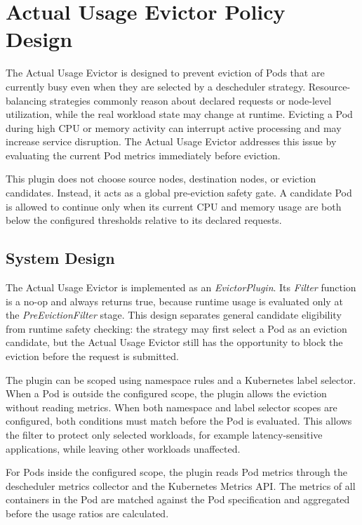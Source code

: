 \section{Actual Usage Evictor Policy Design}
\label{sec:actualusage_policydesign}
The Actual Usage Evictor is designed to prevent eviction of Pods that are currently busy even when they are selected by a descheduler strategy. Resource-balancing strategies commonly reason about declared requests or node-level utilization, while the real workload state may change at runtime. Evicting a Pod during high CPU or memory activity can interrupt active processing and may increase service disruption. The Actual Usage Evictor addresses this issue by evaluating the current Pod metrics immediately before eviction.

This plugin does not choose source nodes, destination nodes, or eviction candidates. Instead, it acts as a global pre-eviction safety gate. A candidate Pod is allowed to continue only when its current CPU and memory usage are both below the configured thresholds relative to its declared requests.

\subsection{System Design}
\label{sec:actualusage_sysoverview}

The Actual Usage Evictor is implemented as an \textit{EvictorPlugin}. Its \textit{Filter} function is a no-op and always returns true, because runtime usage is evaluated only at the \textit{PreEvictionFilter} stage. This design separates general candidate eligibility from runtime safety checking: the strategy may first select a Pod as an eviction candidate, but the Actual Usage Evictor still has the opportunity to block the eviction before the request is submitted.

The plugin can be scoped using namespace rules and a Kubernetes label selector. When a Pod is outside the configured scope, the plugin allows the eviction without reading metrics. When both namespace and label selector scopes are configured, both conditions must match before the Pod is evaluated. This allows the filter to protect only selected workloads, for example latency-sensitive applications, while leaving other workloads unaffected.

For Pods inside the configured scope, the plugin reads Pod metrics through the descheduler metrics collector and the Kubernetes Metrics API. The metrics of all containers in the Pod are matched against the Pod specification and aggregated before the usage ratios are calculated.

